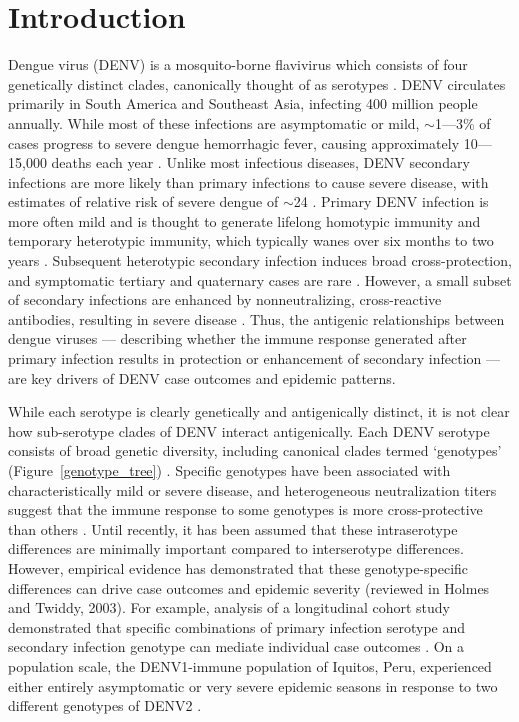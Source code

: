 \documentclass[11pt,oneside,letterpaper]{article}
\begin{document}
\pagebreak

\section*{Introduction}
Dengue virus (DENV) is a mosquito-borne flavivirus which consists of four genetically distinct clades, canonically thought of as serotypes \citep{lanciotti1997molecular}.
DENV circulates primarily in South America and Southeast Asia, infecting 400 million people annually.
While most of these infections are asymptomatic or mild, $\sim$1---3\% of cases progress to severe dengue hemorrhagic fever, causing approximately 10---15,000 deaths each year \citep{bhatt2013global}.
Unlike most infectious diseases, DENV secondary infections are more likely than primary infections to cause severe disease, with estimates of relative risk of severe dengue of $\sim$24 \citep{mizumoto2014risk}.
Primary DENV infection is more often mild and is thought to generate lifelong homotypic immunity and temporary heterotypic immunity, which typically wanes over six months to two years \citep{katzelnick2016neutralizing,sabin1952research}.
Subsequent heterotypic secondary infection induces broad cross-protection, and symptomatic tertiary and quaternary cases are rare  \citep{gibbons2007analysis,olkowski2013reduced}.
However, a small subset of secondary infections are enhanced by nonneutralizing, cross-reactive antibodies, resulting in severe disease \citep{halstead1979vivo,katzelnick2017antibody,sangkawibha1984risk}.
Thus, the antigenic relationships between dengue viruses --- describing whether the immune response generated after primary infection results in protection or enhancement of secondary infection --- are key drivers of DENV case outcomes and epidemic patterns.

While each serotype is clearly genetically and antigenically distinct, it is not clear how sub-serotype clades of DENV interact antigenically.
Each DENV serotype consists of broad genetic diversity, including canonical clades termed `genotypes' (Figure~\ref{genotype_tree}) \citep{rico1990molecular,twiddy2003inferring}.
Specific genotypes have been associated with characteristically mild or severe disease, and heterogeneous neutralization titers suggest that the immune response to some genotypes is more cross-protective than others \citep{gentry1982identification,russell1967dengue}.
Until recently, it has been assumed that these intraserotype differences are minimally important compared to interserotype differences.
However, empirical evidence has demonstrated that these genotype-specific differences can drive case outcomes and epidemic severity (reviewed in Holmes and Twiddy, 2003).
For example, analysis of a longitudinal cohort study demonstrated that specific combinations of primary infection serotype and secondary infection genotype can mediate individual case outcomes \citep{ohainle2011dynamics}.
On a population scale, the DENV1-immune population of Iquitos, Peru, experienced either entirely asymptomatic or very severe epidemic seasons in response to two different genotypes of DENV2 \citep{kochel2002effect}.
\end{document}
